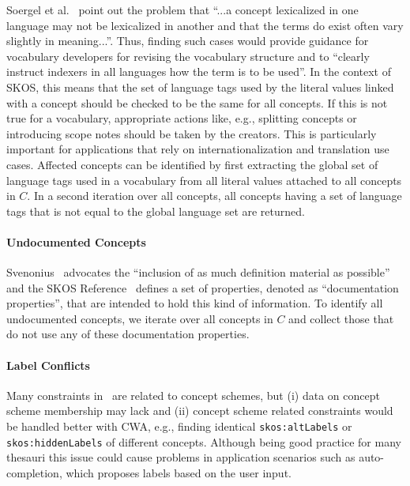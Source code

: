 Soergel et al.~\cite{Soergel1997} point out the problem that ``...a concept lexicalized in one language may not be lexicalized in another and that the terms do exist often vary slightly in meaning...''. Thus, finding such cases would provide guidance for vocabulary developers for revising the vocabulary structure and to ``clearly instruct indexers in all languages how the term is to be used''. In the context of SKOS, this means that the set of language tags used by the literal values linked with a concept should be checked to be the same for all concepts. If this is not true for a vocabulary, appropriate actions like, e.g., splitting concepts or introducing scope notes should be taken by the creators. This is particularly important for applications that rely on internationalization and translation use cases.
Affected concepts can be identified by first extracting the global set of language tags used in a vocabulary from all literal values attached to all concepts in $C$. In a second iteration over all concepts, all concepts having a set of language tags that is not equal to the global language set are returned.

\paragraph{Undocumented Concepts}

Svenonius~\cite{Svenonius1997} advocates the ``inclusion of as much definition material as possible'' and the SKOS Reference~\cite{SkosReference2008} defines a set of properties, denoted as ``documentation properties'', that are intended to hold this kind of information.
To identify all undocumented concepts, we iterate over all concepts in $C$ and collect those that do not use any of these documentation properties.

\paragraph{Label Conflicts}

Many constraints in~\cite{SkosReference2008,Isaac2009} are related to concept schemes, but (i) data on concept scheme membership may lack and (ii) concept scheme related constraints would be handled better with CWA, e.g., finding identical \texttt{skos:altLabels} or \texttt{skos:hiddenLabels} of different concepts. Although being good practice for many thesauri this issue could cause problems in application scenarios such as auto-completion, which proposes labels based on the user input.

